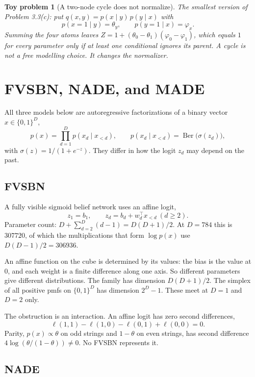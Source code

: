 \documentclass[11pt]{article}
\newtheorem{toy}{Toy problem}
\theoremstyle{remark}
\newcommand{\Ber}{\operatorname{Ber}}
\begin{document}
\begin{toy}[A two-node cycle does not normalize]
The smallest version of Problem 3.3(c): put \(q(x,y)=p(x\mid y)\,p(y\mid x)\) with
\[
p(x=1\mid y)=\theta_y,\qquad p(y=1\mid x)=\varphi_x.
\]
Summing the four atoms leaves \(Z=1+(\theta_0-\theta_1)(\varphi_0-\varphi_1)\), which equals \(1\) for every parameter only if at least one conditional ignores its parent. A cycle is not a free modelling choice. It changes the normalizer.
\end{toy}

\section{FVSBN, NADE, and MADE}
\label{sec:nade}

All three models below are autoregressive factorizations of a binary vector \(x\in\{0,1\}^D\),
\[
p(x)=\prod_{d=1}^D p(x_d\mid x_{<d}),\qquad
p(x_d\mid x_{<d})=\Ber\big(\sigma(z_d)\big),
\]
with \(\sigma(z)=1/(1+e^{-z})\). They differ in how the logit \(z_d\) may depend on the past.

\subsection{FVSBN}

A fully visible sigmoid belief network uses an affine logit,
\[
z_1=b_1,\qquad z_d=b_d+w_d^\top x_{<d}\ (d\ge 2).
\]
Parameter count: \(D+\sum_{d=2}^D(d-1)=D(D+1)/2\). At \(D=784\) this is \(307720\), of which the multiplications that form \(\log p(x)\) use \(D(D-1)/2=306936\).

An affine function on the cube is determined by its values: the bias is the value at \(0\), and each weight is a finite difference along one axis. So different parameters give different distributions. The family has dimension \(D(D+1)/2\). The simplex of all positive pmfs on \(\{0,1\}^D\) has dimension \(2^D-1\). These meet at \(D=1\) and \(D=2\) only.

The obstruction is an interaction. An affine logit has zero second differences,
\[
\ell(1,1)-\ell(1,0)-\ell(0,1)+\ell(0,0)=0.
\]
Parity, \(p(x)\propto\theta\) on odd strings and \(1-\theta\) on even strings, has second difference \(4\log(\theta/(1-\theta))\ne 0\). No FVSBN represents it.

\subsection{NADE}
\end{document}
